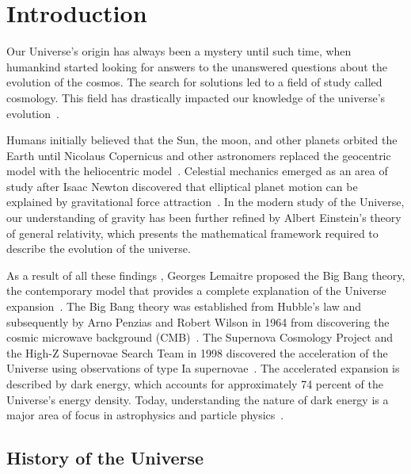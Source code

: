 \chapter{Introduction}

Our Universe's origin has always been a mystery until such time, when humankind started looking for answers to the unanswered questions about the evolution of the cosmos. The search for solutions led to a field of study called cosmology. This field has drastically impacted our knowledge of the universe's evolution~\citep{book:909085}.

Humans initially believed that the Sun, the moon, and other planets orbited the Earth until Nicolaus Copernicus and other astronomers replaced the geocentric model with the heliocentric model~\citep{sep-copernicus, kanas}.  Celestial mechanics emerged as an area of study after Isaac Newton discovered that elliptical planet motion can be explained by gravitational force attraction~\citep{crowe2013theories,sep-copernicus}. In the modern study of the Universe, our understanding of gravity has been further refined by Albert Einstein's theory of general relativity, which presents the mathematical framework required to describe the evolution of the universe.
	
As a result of all these findings , Georges Lemaitre proposed the Big Bang theory, the contemporary model that provides a complete explanation of the Universe expansion~\citep{1926ApJ....64..321H}. The Big Bang theory was established from Hubble's law and subsequently by Arno Penzias and Robert Wilson in 1964 from discovering the cosmic microwave background (CMB)~\citep{1965ApJ...142..419P,2003RvMP...75..559P,1929PNAS...15..168H}. The Supernova Cosmology Project and the High-Z Supernovae Search Team in 1998 discovered the acceleration of the Universe using observations of type Ia supernovae~\citep{1998AJ....116.1009R, 1999ApJ...517..565P}. The accelerated expansion is described by dark energy, which accounts for approximately 74 percent of the Universe's energy density. Today, understanding the nature of dark energy is a major area of focus in astrophysics and particle physics~\citep{2008ARA&A..46..385F}. 
	
	\section{History of the Universe}
	
